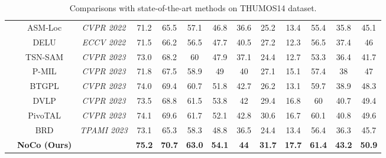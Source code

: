 \begin{table*}[htp]
{\begin{tabular}{ccccccccccccc}
\multicolumn{1}{c|}{}& ASM-Loc& \multicolumn{1}{c|}{\textit{CVPR 2022}}& 71.2& 65.5& 57.1& 46.8& 36.6& 25.2& \multicolumn{1}{c|}{13.4}& 55.4& 35.8& 45.1  \\
\multicolumn{1}{c|}{}& DELU& \multicolumn{1}{c|}{\textit{ECCV 2022}}& 71.5& 66.2& 56.5& 47.7& 40.5& 27.2& \multicolumn{1}{c|}{12.3}& 56.5& 37.4& 46 \\
\multicolumn{1}{c|}{}& TSN-SAM& \multicolumn{1}{c|}{\textit{CVPR 2023}}& 73.0& 68.2& 60& 47.9& 37.1& 24.4& \multicolumn{1}{c|}{12.7}& 53.3& 36.4& 41.7  \\
\multicolumn{1}{c|}{}& P-MIL& \multicolumn{1}{c|}{\textit{CVPR 2023}}& 71.8& 67.5& 58.9& 49& 40& 27.1& \multicolumn{1}{c|}{15.1}& 57.4& 38& 47 \\
\multicolumn{1}{c|}{}& BTGPL& \multicolumn{1}{c|}{\textit{CVPR 2023}}& 74.0& 69.4& 60.7& 51.8& 42.7& 26.2& \multicolumn{1}{c|}{13.1}& 59.7& 38.9& 48.3  \\
\multicolumn{1}{c|}{}& DVLP& \multicolumn{1}{c|}{\textit{CVPR 2023}}& 73.5& 68.8& 61.5& 53.8& 42& 29.4& \multicolumn{1}{c|}{16.8}& 60& 40.7& 49.4  \\
\multicolumn{1}{c|}{}& PivoTAL& \multicolumn{1}{c|}{\textit{CVPR 2023}}& 74.1& 69.6& 61.7& 52.1& 42.8& 30.6& \multicolumn{1}{c|}{16.7}& 60.1& 40.8& 49.6  \\
\multicolumn{1}{c|}{}& BRD& \multicolumn{1}{c|}{\textit{TPAMI 2023}}& 73.1& 65.3& 58.3& 48.8& 36.5& 24.4& \multicolumn{1}{c|}{13.4}& 56.4& 36.3& 45.7  \\ \cline{2-13} 
\multicolumn{1}{c|}{}& \textbf{NoCo (Ours)}& \multicolumn{1}{c|}{}& \textbf{75.2}& \textbf{70.7}& \textbf{63.0}& \textbf{54.1}& \textbf{44}& \textbf{31.7}& \multicolumn{1}{c|}{\textbf{17.7}}& \textbf{61.4}& \textbf{43.2}& \textbf{50.9} \\ \hline
\end{tabular}
}
\caption{Comparisons with state-of-the-art methods on THUMOS14 dataset.}
\label{baseline-on THUMOS14}
\end{table*}
\fi